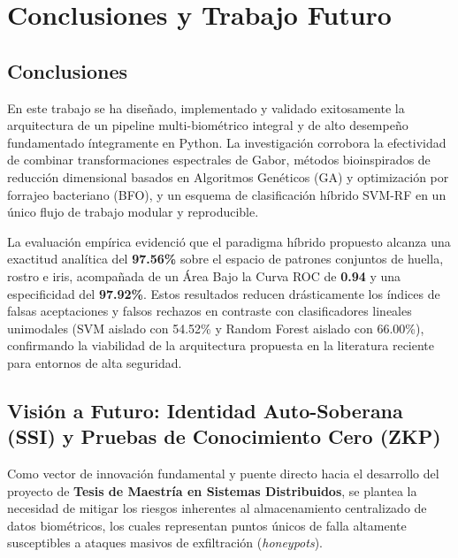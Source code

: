\section{Conclusiones y Trabajo Futuro}\label{sec:conclusions}

\subsection{Conclusiones}
En este trabajo se ha diseñado, implementado y validado exitosamente la arquitectura de un pipeline multi-biométrico integral y de alto desempeño fundamentado íntegramente en Python. La investigación corrobora la efectividad de combinar transformaciones espectrales de Gabor, métodos bioinspirados de reducción dimensional basados en Algoritmos Genéticos (GA) y optimización por forrajeo bacteriano (BFO), y un esquema de clasificación híbrido SVM-RF en un único flujo de trabajo modular y reproducible.

La evaluación empírica evidenció que el paradigma híbrido propuesto alcanza una exactitud analítica del \textbf{97.56\%} sobre el espacio de patrones conjuntos de huella, rostro e iris, acompañada de un Área Bajo la Curva ROC de \textbf{0.94} y una especificidad del \textbf{97.92\%}. Estos resultados reducen drásticamente los índices de falsas aceptaciones y falsos rechazos en contraste con clasificadores lineales unimodales (SVM aislado con 54.52\% y Random Forest aislado con 66.00\%), confirmando la viabilidad de la arquitectura propuesta en la literatura reciente para entornos de alta seguridad.

\subsection{Visión a Futuro: Identidad Auto-Soberana (SSI) y Pruebas de Conocimiento Cero (ZKP)}
Como vector de innovación fundamental y puente directo hacia el desarrollo del proyecto de \textbf{Tesis de Maestría en Sistemas Distribuidos}, se plantea la necesidad de mitigar los riesgos inherentes al almacenamiento centralizado de datos biométricos, los cuales representan puntos únicos de falla altamente susceptibles a ataques masivos de exfiltración (\textit{honeypots}).

